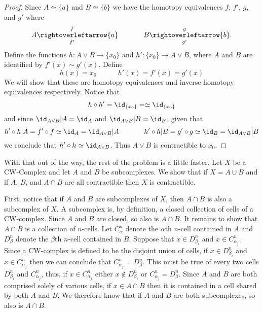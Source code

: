\begin{homework}[e]
\begin{prf}
\begin{proof}
		   \bigskip
		   
		   Since $A \simeq \{a\}$ and $B \simeq \{b\}$ we have the homotopy equivalences $f$, $f'$, $g$, and $g'$ where 
		   \begin{equation*}
			   A \underset{f'}{\overset{f}{\rightoverleftarrow}} \{a\} 
			   \hspace{36pt}
			   B \underset{g'}{\overset{g}{\rightoverleftarrow}} \{b\}. 
		   \end{equation*}
		   Define the functions $h: A \vee B \rightarrow \{x_0\}$ and $h' : \{x_0\} \rightarrow A\vee B$, where $A$ and $B$ are identified by $f'(x) \sim g'(x)$. Define 
		   \begin{equation*}
			   h(x) = x_0 \hspace{36pt} h'(x) = f'(x) = g'(x)
		   \end{equation*}
		   We will show that these are homotopy equivalences and inverse homotopy equivalences respectively. Notice that 
		   \begin{equation*}
			   h \circ h' = \id_{\{x_0\}} = \simeq \id_{\{x_0\}}
		   \end{equation*}
		   and since $\id_{A \vee B} | A = \id_A$ and $\id_{A \vee B} | B = \id_B$, given that 
		   \begin{equation*}
			   h' \circ h | A = f' \circ f \simeq \id_{A} = \id_{A \vee B} | A
			   \hspace{36pt}
			   h' \circ h | B = g' \circ g \simeq \id_{B} = \id_{A \vee B} | B
		   \end{equation*}
		   we conclude that $h' \circ h \simeq \id_{A \vee B}$. Thus $A \vee B$ is contractible to $x_0$.
		\end{proof}

		\bigskip

		With that out of the way, the rest of the problem is a little faster. Let $X$ be a CW-Complex and let $A$ and $B$ be subcomplexes. We show that if $X = A \cup B$ and if $A$, $B$, and $A \cap B$ are all contractible then $X$ is contractible.

		\bigskip

		First, notice that if $A$ and $B$ are subcomplexes of $X$, then $A \cap B$ is also a subcomplex of $X$. A subcomplex is, by definition, a closed collection of cells of a CW-complex. Since $A$ and $B$ are closed, so also is $A \cap B$. It remains to show that $A \cap B$ is a collection of $n$-cells. Let $C_\alpha^n$ denote the $\alpha$th $n$-cell contained in $A$ and $D_\beta^n$ denote the $\beta$th $n$-cell contained in $B$. Suppose that $x \in D_{\beta_i}^n$ and $x \in C_{\alpha_j}^n$. Since a CW-complex is defined to be the disjoint union of cells, if $x \in D_{\beta_i}^n$ and $x \in C_{\alpha_j}^n$ then we can conclude that $C_{\alpha_j}^n = D_{\beta}^n$. This must be true of every two cells $D_{\beta_i}^n$ and $C_{\alpha_j}^n$, thus, if $x \in C_{\alpha_j}^n$ either $x \not\in D_{\beta_i}^n$ or $C_{\alpha_j}^n = D_{\beta}^n$. Since $A$ and $B$ are both comprised solely of various cells, if $x \in A \cap B$ then it is contained in a cell shared by both $A$ and $B$. We therefore know that if $A$ and $B$ are both subcomplexes, so also is $A \cap B$.


\end{prf}
\end{homework}
